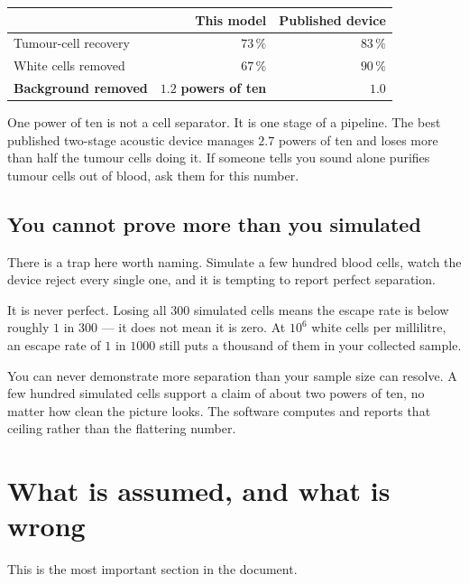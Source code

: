 \documentclass[11pt,a4paper]{article}
\begin{document}
\begin{center}\small
\begin{tabular}{lrr}
\toprule
& This model & Published device \\
\midrule
Tumour-cell recovery & $73\,\%$ & $83\,\%$ \\
White cells removed & $67\,\%$ & $90\,\%$ \\
\textbf{Background removed} & $\mathbf{1.2}$ \textbf{powers of ten}
& $\mathbf{1.0}$ \\
\bottomrule
\end{tabular}
\end{center}

\begin{plain}
One power of ten is not a cell separator. It is one stage of a pipeline. The
best published two-stage acoustic device manages $2.7$ powers of ten and loses
more than half the tumour cells doing it. If someone tells you sound alone
purifies tumour cells out of blood, ask them for this number.
\end{plain}

\subsection*{You cannot prove more than you simulated}

There is a trap here worth naming. Simulate a few hundred blood cells, watch the
device reject every single one, and it is tempting to report perfect separation.

It is never perfect. Losing all 300 simulated cells means the escape rate is
below roughly $1$ in $300$ --- it does not mean it is zero. At $10^6$ white cells
per millilitre, an escape rate of $1$ in $1000$ still puts a thousand of them in
your collected sample.

\begin{keybox}
You can never demonstrate more separation than your sample size can resolve.
A few hundred simulated cells support a claim of about two powers of ten, no
matter how clean the picture looks. The software computes and reports that
ceiling rather than the flattering number.
\end{keybox}

\section{What is assumed, and what is wrong}
\label{sec:limits}

This is the most important section in the document.
\end{document}
